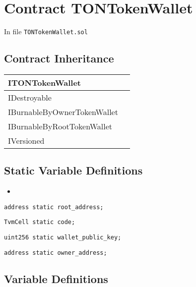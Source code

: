 
\chapter{Contract TONTokenWallet}

\minitoc

In file {\tt TONTokenWallet.sol}

\section{Contract Inheritance}

\noindent\begin{tabular}{|l|p{5cm}|}\hline
ITONTokenWallet & \\\hline
IDestroyable & \\\hline
IBurnableByOwnerTokenWallet & \\\hline
IBurnableByRootTokenWallet & \\\hline
IVersioned & \\\hline
\end{tabular}

\section{Static Variable Definitions}

\begin{itemize}
\item \issueStatic{}
\end{itemize}

\begin{lstlisting}[firstnumber=24]
    address static root_address;
\end{lstlisting}

\begin{lstlisting}[firstnumber=25]
    TvmCell static code;
\end{lstlisting}

\begin{lstlisting}[firstnumber=27]
    uint256 static wallet_public_key;
\end{lstlisting}

\begin{lstlisting}[firstnumber=29]
    address static owner_address;
\end{lstlisting}

\section{Variable Definitions}

